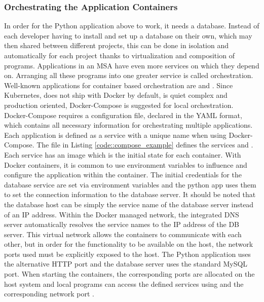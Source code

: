         \subsubsection{Orchestrating the Application Containers}
        In order for the Python application above to work, it needs a database. Instead of each developer having to install and set up a database on their own, which may then shared between different projects, this can be done in isolation and automatically for each project thanks to virtualization and composition of programs. Applications in an \ac{MSA} have even more services on which they depend on. Arranging all these programs into one greater service is called orchestration. Well-known applications for container based orchestration are  and . Since Kubernetes, does not ship with Docker by default, is quiet complex and production oriented, Docker-Compose is suggested for local orchestration.\newline
        Docker-Compose requires a configuration file, declared in the \acs{YAML} format, which contains all necessary information for orchestrating multiple applications. Each application is defined as a service with a unique name when using Docker-Compose. The  file in Listing \ref{code::compose_example} defines the services  and . Each service has an image which is the initial state for each container. With Docker containers, it is common to use environment variables to influence and configure the application within the container. The initial credentials for the database service are set via environment variables and the python app uses them to set the connection information to the database server. It should be noted that the database host can be simply the service name of the database server instead of an IP address. Within the Docker managed network, the integrated DNS server automatically resolves the service names to the IP address of the \ac{DB} server. This virtual network allows the containers to communicate with each other, but in order for the functionality to be available on the host, the network ports used must be explicitly exposed to the host. The Python application uses the alternative \acs{HTTP} port  and the database server uses the standard MySQL port. When starting the containers, the corresponding ports are allocated on the host system and local programs can access the defined services using  and the corresponding network port \cite{dockerdocs}.\newline

